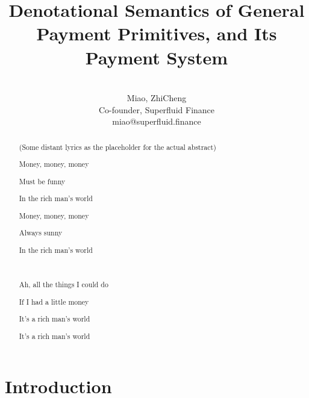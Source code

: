 




\title{Denotational Semantics of General Payment Primitives, and Its Payment System}

\author{\\
    Miao, ZhiCheng\\
    Co-founder, Superfluid Finance\\
    miao@superfluid.finance
}


\maketitle

\begin{abstract}
    \begin{center}
        (Some distant lyrics as the placeholder for the actual abstract)

        Money, money, money

        Must be funny

        In the rich man's world

        Money, money, money

        Always sunny

        In the rich man's world

        \

        Ah, all the things I could do

        If I had a little money

        It's a rich man's world

        It's a rich man's world
    \end{center}
\end{abstract}

\chapter{Introduction}

